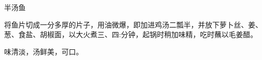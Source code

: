 \begin{recipe}{半汤鱼}

\ingredients


\cooking

将鱼片切成一分多厚的片子，用油微爆，即加进鸡汤二瓢半，并放下萝卜丝、姜、葱、食盐、胡椒面，以大火煮三、四:分钟，起锅时稍加味精，吃时蘸以毛姜醋。

\notes

味清淡，汤鲜美，可口。

\end{recipe}

